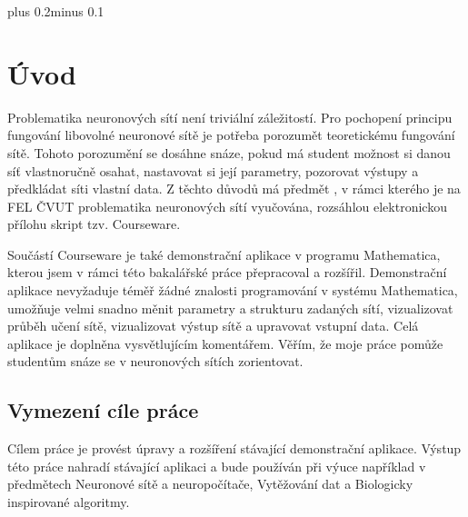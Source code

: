 \documentclass[11pt,twoside,a4paper]{book}
\begin{document}
\mainbodystarts
\normalfont
{}\baselineskip plus 0.2\baselineskip minus 0.1\baselineskip



% 
% 

\chapter{Úvod}
Problematika neuronových sítí není triviální záležitostí. Pro pochopení principu fungování libovolné neuronové sítě je potřeba porozumět teoretickému fungování sítě. Tohoto porozumění se dosáhne snáze, pokud má student možnost si danou síť vlastnoručně osahat, nastavovat si její parametry, pozorovat výstupy a předkládat síti vlastní data. Z těchto důvodů má předmět , v rámci kterého je na FEL ČVUT problematika neuronových sítí vyučována, rozsáhlou elektronickou přílohu skript tzv. Courseware\cite{courseware}.

Součástí Courseware je také demonstrační aplikace v programu Mathematica, kterou jsem v rámci této bakalářské práce přepracoval a rozšířil. Demonstrační aplikace nevyžaduje téměř žádné znalosti programování v systému Mathematica, umožňuje velmi snadno měnit parametry a strukturu zadaných sítí, vizualizovat průběh učení sítě, vizualizovat výstup sítě a upravovat vstupní data. Celá aplikace je doplněna vysvětlujícím komentářem. Věřím, že moje práce pomůže studentům snáze se v neuronových sítích zorientovat.
\section{Vymezení cíle práce}
Cílem práce je provést úpravy a rozšíření stávající demonstrační aplikace. Výstup této práce nahradí stávající aplikaci a bude používán při výuce například v předmětech Neuronové sítě a neuropočítače, Vytěžování dat a Biologicky inspirované algoritmy.
\end{document}
